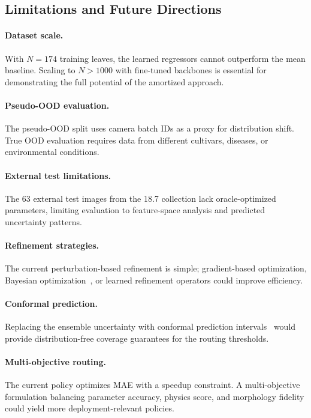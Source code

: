 \documentclass[11pt,a4paper]{article}
\begin{document}
\subsection{Limitations and Future Directions}

\paragraph{Dataset scale.}
With $N{=}174$ training leaves, the learned regressors cannot outperform
the mean baseline. Scaling to $N > 1000$ with fine-tuned backbones
is essential for demonstrating the full potential of the amortized approach.

\paragraph{Pseudo-OOD evaluation.}
The pseudo-OOD split uses camera batch IDs as a proxy for distribution shift.
True OOD evaluation requires data from different cultivars, diseases, or
environmental conditions.

\paragraph{External test limitations.}
The 63 external test images from the 18.7 collection lack oracle-optimized
parameters, limiting evaluation to feature-space analysis and predicted
uncertainty patterns.

\paragraph{Refinement strategies.}
The current perturbation-based refinement is simple; gradient-based
optimization, Bayesian optimization~\cite{shahriari2016taking},
or learned refinement operators could improve efficiency.

\paragraph{Conformal prediction.}
Replacing the ensemble uncertainty with conformal prediction
intervals~\cite{angelopoulos2023conformal} would provide
distribution-free coverage guarantees for the routing thresholds.

\paragraph{Multi-objective routing.}
The current policy optimizes MAE with a speedup constraint.
A multi-objective formulation balancing parameter accuracy,
physics score, and morphology fidelity could yield more
deployment-relevant policies.
\end{document}
